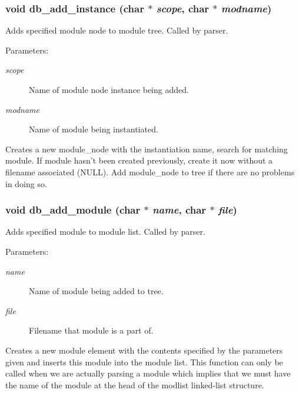 \subsubsection{\setlength{\rightskip}{0pt plus 5cm}void db\_\-add\_\-instance (char $\ast$ {\em scope}, char $\ast$ {\em modname})}\label{db_8h_a2}


Adds specified module node to module tree. Called by parser.

\begin{Desc}
\item[Parameters: ]\par
\begin{description}
\item[{\em 
scope}]Name of module node instance being added. \item[{\em 
modname}]Name of module being instantiated.\end{description}
\end{Desc}
Creates a new module\_\-node with the instantiation name, search for matching module. If module hasn't been created previously, create it now without a filename associated (NULL). Add module\_\-node to tree if there are no problems in doing so. 
\subsubsection{\setlength{\rightskip}{0pt plus 5cm}void db\_\-add\_\-module (char $\ast$ {\em name}, char $\ast$ {\em file})}\label{db_8h_a3}


Adds specified module to module list. Called by parser.

\begin{Desc}
\item[Parameters: ]\par
\begin{description}
\item[{\em 
name}]Name of module being added to tree. \item[{\em 
file}]Filename that module is a part of.\end{description}
\end{Desc}
Creates a new module element with the contents specified by the parameters given and inserts this module into the module list. This function can only be called when we are actually parsing a module which implies that we must have the name of the module at the head of the modlist linked-list structure. 
